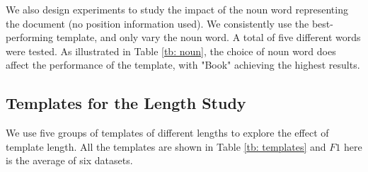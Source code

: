 \documentclass[11pt]{article}
\begin{document}
We also design experiments to study the impact of the noun word representing the document (no position information used). We consistently use the best-performing template, and only vary the noun word. A total of five different words were tested. As illustrated in Table \ref{tb: noun}, the choice of noun word does affect the performance of the template, with "Book" achieving the highest results.

\subsection{Templates for the Length Study}
\label{app: length}
\noindent We use five groups of templates of different lengths to explore the effect of template length. All the templates are shown in Table \ref{tb: templates} and $F1$ here is the average of six datasets.
\end{document}

